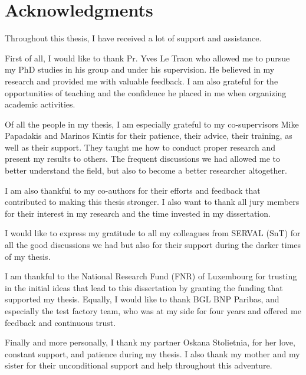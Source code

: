 \chapter*{Acknowledgments}

Throughout this thesis, I have received a lot of support and assistance.

First of all, I would like to thank Pr. Yves Le Traon who allowed me to
pursue my PhD studies in his group and under his supervision. He believed in my research and provided me with valuable feedback. I am also grateful for the opportunities of teaching and the confidence he placed in me when organizing academic activities.

Of all the people in my thesis, I am especially grateful to my co-supervisors Mike Papadakis and Marinos Kintis for their patience, their advice, their training, as well as their support. They taught me how to conduct proper research and present my results to others. The frequent discussions we had allowed me to better understand the field, but also to become a better researcher altogether.

I am also thankful to my co-authors for their efforts and feedback that contributed to making this thesis stronger. I also want to thank all jury members for their interest in my research and the time invested in my dissertation.

I would like to express my gratitude to all my colleagues from SERVAL (SnT) for all the good discussions we had but also for their support during the darker times of my thesis.

I am thankful to the National Research Fund (FNR) of Luxembourg for trusting in the initial ideas that lead to this dissertation by granting the funding that supported my thesis. Equally, I would like to thank BGL BNP Paribas, and especially the test factory team, who was at my side for four years and offered me feedback and continuous trust.

Finally and more personally, I thank my partner Oskana Stolietnia, for her love, constant support, and patience during my thesis. I also thank my mother and my sister for their unconditional support and help throughout this adventure.